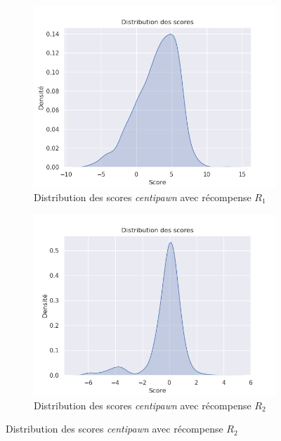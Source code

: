 \documentclass[11pt]{article}
\begin{document}
\begin{figure}[H]
  \centering
	\begin{subfigure}[b]{0.45\textwidth}
	  \centering \includegraphics[scale=0.5]{kdeblancs.png}
	  \caption{Distribution des scores \textit{centipawn} avec
            récompense $R_{1}$}
		\label{kdeblancs}
	\end{subfigure}
	\begin{subfigure}[b]{0.45\textwidth}
	  \centering \includegraphics[scale=0.5]{kdescoreegaux.png}
	  \caption{Distribution des scores \textit{centipawn} avec
            récompense $R_{2}$}
		\label{kdescoreegaux}
	\end{subfigure}
\end{figure}
\end{document}
